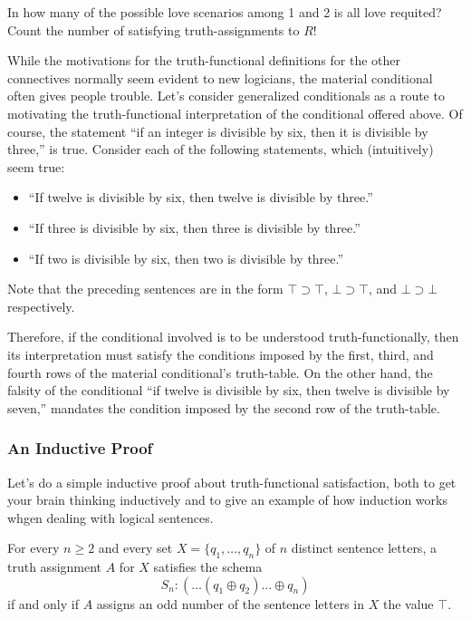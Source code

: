 \begin{aside}
    In how many of the possible love scenarios among 1 and 2 is all love requited? Count the number of satisfying truth-assignments to $R$!
\end{aside}

While the motivations for the truth-functional definitions for the other connectives normally seem evident to new logicians, the material conditional often gives people trouble. Let's consider generalized conditionals as a route to motivating the truth-functional interpretation of the conditional offered above. Of course, the statement ``if an integer is divisible by six, then it is divisible by three,'' is true. Consider each of the following statements, which (intuitively) seem true: 
\begin{itemize}
\item ``If twelve is divisible by six, then twelve is divisible by three.''
\item ``If three is divisible by six, then three is divisible by three.''
\item ``If two is divisible by six, then two is divisible by three.''
\end{itemize}
Note that the preceding sentences are in the form $\top \supset \top$, $\bot \supset \top$, and $\bot \supset \bot$ respectively. 

Therefore, if the conditional involved is to be understood truth-functionally, then its interpretation must satisfy the conditions imposed by the first, third, and fourth rows of the material conditional's truth-table. On the other hand, the falsity of the conditional ``if twelve is divisible by six, then twelve is divisible by seven,'' mandates the condition imposed by the second row of the truth-table.

\subsubsection*{An Inductive Proof}
Let's do a simple inductive proof about truth-functional satisfaction, both to get your brain thinking inductively and to give an example of how induction works whgen dealing with logical sentences. 

\begin{proposition}\label{parity-prop}
For every $n\geq 2$ and every set $X=\{q_1,\ldots,q_n\}$ of $n$ distinct sentence letters, a truth assignment $A$ for $X$ satisfies the schema
\[S_n: (\ldots(q_1\oplus q_2)\ldots\oplus q_n)\]
if and only if $A$ assigns an odd number of the sentence letters in $X$ the value $\top$.
\end{proposition}

